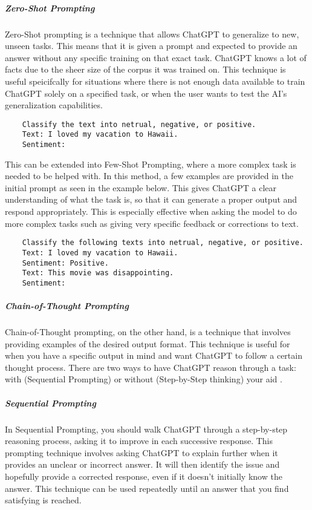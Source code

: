\documentclass[12pt]{article}
\begin{document}
\subparagraph{Zero-Shot Prompting} Zero-Shot prompting is a technique that allows ChatGPT to generalize to new, unseen tasks. This means that it is given a prompt and expected to provide an answer without any specific training on that exact task. ChatGPT knows a lot of facts due to the sheer size of the corpus it was trained on. This technique is useful speicifcally for situations where there is not enough data available to train ChatGPT solely on a specified task, or when the user wants to test the AI's generalization capabilities. 

\begin{verbatim}
    Classify the text into netrual, negative, or positive.
    Text: I loved my vacation to Hawaii.
    Sentiment:
\end{verbatim}

This can be extended into Few-Shot Prompting, where a more complex task is needed to be helped with. In this method, a few examples are provided in the initial prompt as seen in the example below. This gives ChatGPT a clear understanding of what the task is, so that it can generate a proper output and respond appropriately. This is especially effective when asking the model to do more complex tasks such as giving very specific feedback or corrections to text.

\begin{verbatim}
    Classify the following texts into netrual, negative, or positive.
    Text: I loved my vacation to Hawaii.
    Sentiment: Positive.
    Text: This movie was disappointing.
    Sentiment:
\end{verbatim}

\subparagraph{Chain-of-Thought Prompting} Chain-of-Thought prompting, on the other hand, is a technique that involves providing examples of the desired output format. This technique is useful for when you have a specific output in mind and want ChatGPT to follow a certain thought process. There are two ways to have ChatGPT reason through a task: with (Sequential Prompting) or without (Step-by-Step thinking) your aid . 

\subparagraph{Sequential Prompting} In Sequential Prompting, you should walk ChatGPT through a step-by-step reasoning process, asking it to improve in each successive response. This prompting technique involves asking ChatGPT to explain further when it provides an unclear or incorrect answer. It will then identify the issue and hopefully provide a corrected response, even if it doesn't initially know the answer. This technique can be used repeatedly until an answer that you find satisfying is reached.
\end{document}
